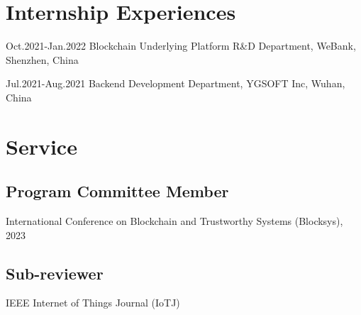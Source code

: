 \documentclass[12pt,letterpaper]{report}
\newcommand{\listitemspace}{0.25em}
\renewenvironment{itemize}
{\begin{list}{}{\setlength{\leftmargin}{0em}
                \setlength{\parskip}{0em}
                \setlength{\itemsep}{\listitemspace}
                \setlength{\parsep}{\listitemspace}}}
{\end{list}}
\begin{document}
    \section*{Internship Experiences}
    \begin{tablist}
        \item[Oct.2021-Jan.2022] \tab{}Blockchain Underlying Platform R\&D Department, WeBank, Shenzhen, China
        \item[Jul.2021-Aug.2021] \tab{}Backend Development Department, YGSOFT Inc, Wuhan, China
    \end{tablist}


    \section*{Service}
    \subsection*{Program Committee Member}
    \begin{itemize}
        \item International Conference on Blockchain and Trustworthy Systems (Blocksys), 2023
    \end{itemize}
    \subsection*{Sub-reviewer}
    \begin{itemize}
        \item IEEE Internet of Things Journal (IoTJ)
    \end{itemize}
\end{document}
